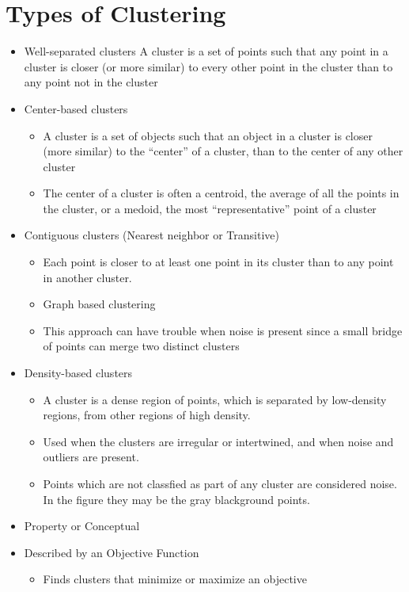 \section{Types of Clustering}
\begin{itemize}
	\item Well-separated clusters
	A cluster is a set of points such that any point in a cluster is closer (or more similar) to every other point in the cluster than to any point not in the cluster
	\item Center-based clusters
	\begin{itemize}
		\item A cluster is a set of objects such that an object in a cluster is
closer (more similar) to the “center” of a cluster, than to the
center of any other cluster
	\item The center of a cluster is often a centroid, the average of all
the points in the cluster, or a medoid, the most “representative”
point of a cluster
	\end{itemize}
	\item Contiguous clusters (Nearest neighbor or
Transitive)
\begin{itemize}
	\item Each point is closer to at least one point in its cluster than to
any point in another cluster.
	\item Graph based clustering
	\item This approach can have trouble when noise is present since a
small bridge of points can merge two distinct clusters
\end{itemize}
	\item Density-based clusters
	\begin{itemize}
		\item A cluster is a dense region of points, which is separated by
low-density regions, from other regions of high density.
	\item Used when the clusters are irregular or intertwined, and when
noise and outliers are present.
\item Points which are not classfied as part of any cluster are considered noise. In the figure they may be the gray blackground points.
	\end{itemize}
	\item Property or Conceptual
	\item Described by an Objective Function
\begin{itemize}
	\item Finds clusters that minimize or maximize an objective

\end{itemize}
\end{itemize}
